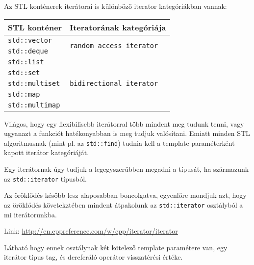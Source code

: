 \documentclass[a4paper,11.5pt,table]{article}
\begin{document}
	\smallskip
	Az STL konténerek iterátorai is különböző iterator kategóriákban vannak:
	\begin{center}
		\setlength{\extrarowheight}{2pt}
		\begin{tabular}{|l|l|}
			\hline
			STL konténer&Iteratorának kategóriája\\
			\hline
			\hline
			\texttt{std::vector} & \multirow{2}{*}{\texttt{random access iterator}}\\
			\texttt{std::deque} &\\
			\hline
			\texttt{std::list} & \multirow{5}{*}{\texttt{bidirectional iterator}}\\
			\texttt{std::set} & \\
			\texttt{std::multiset} & \\
			\texttt{std::map} & \\
			\texttt{std::multimap} & \\
			\hline
		\end{tabular}
	\end{center}
	Világos, hogy egy flexibilisebb iterátorral több mindent meg tudunk tenni, vagy ugyanazt a funkciót hatékonyabban is meg tudjuk valósítani. Emiatt minden STL algoritmusnak (mint pl. az \texttt{std::find}) tudnia kell a template paraméterként kapott iterátor kategóriáját.
	\medskip
	
	Egy iterátornak úgy tudjuk a legegyszerűbben megadni a típusát, ha származunk az \texttt{std::iterator} típusból.
	\begin{note}
		Az öröklődés később lesz alaposabban boncolgatva, egyenlőre mondjuk azt, hogy az öröklődés követekztében mindent átpakolunk az \texttt{std::iterator} osztályból a mi iterátorunkba.
	\end{note}
	
	Link: \url{http://en.cppreference.com/w/cpp/iterator/iterator}
	\smallskip
	
	Látható hogy ennek osztálynak két kötelező template paramétere van, egy iterátor típus tag, és dereferáló operátor visszatérési értéke.
	
\end{document}
